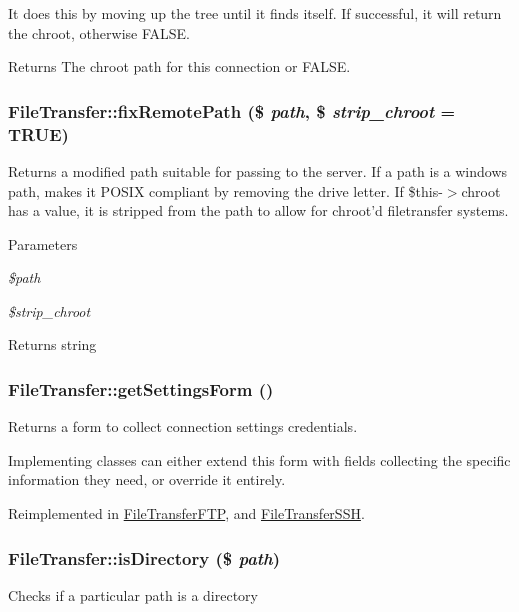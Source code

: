 It does this by moving up the tree until it finds itself. If successful, it will return the chroot, otherwise FALSE.

\begin{DoxyReturn}{Returns}
The chroot path for this connection or FALSE. 
\end{DoxyReturn}
\hypertarget{classFileTransfer_aeb01984e5d0dfab6959a0ac717578786}{
\subsubsection[{fixRemotePath}]{\setlength{\rightskip}{0pt plus 5cm}FileTransfer::fixRemotePath (\$ {\em path}, \/  \$ {\em strip\_\-chroot} = {\ttfamily TRUE})}}
\label{classFileTransfer_aeb01984e5d0dfab6959a0ac717578786}
Returns a modified path suitable for passing to the server. If a path is a windows path, makes it POSIX compliant by removing the drive letter. If \$this-\/$>$chroot has a value, it is stripped from the path to allow for chroot'd filetransfer systems.


\begin{DoxyParams}{Parameters}
\item[{\em \$path}]\item[{\em \$strip\_\-chroot}]\end{DoxyParams}
\begin{DoxyReturn}{Returns}
string 
\end{DoxyReturn}
\hypertarget{classFileTransfer_a3b5e843b16814bdbe43dfecda17bae33}{
\subsubsection[{getSettingsForm}]{\setlength{\rightskip}{0pt plus 5cm}FileTransfer::getSettingsForm ()}}
\label{classFileTransfer_a3b5e843b16814bdbe43dfecda17bae33}
Returns a form to collect connection settings credentials.

Implementing classes can either extend this form with fields collecting the specific information they need, or override it entirely. 

Reimplemented in \hyperlink{classFileTransferFTP_a01948a51036c8bf682bc084f2457986b}{FileTransferFTP}, and \hyperlink{classFileTransferSSH_a56142f1f2a4e513a727fb4cc2a029e74}{FileTransferSSH}.\hypertarget{classFileTransfer_a86c4289cfeccacf9bd2bcae8961889ab}{
\subsubsection[{isDirectory}]{\setlength{\rightskip}{0pt plus 5cm}FileTransfer::isDirectory (\$ {\em path})}}
\label{classFileTransfer_a86c4289cfeccacf9bd2bcae8961889ab}
Checks if a particular path is a directory


